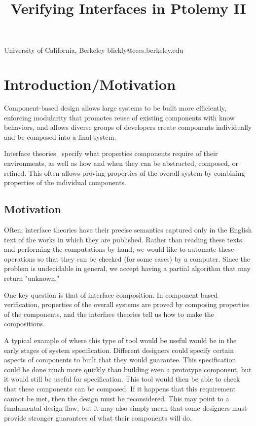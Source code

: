 \documentclass[preprint,11pt]{sigplanconf}
\begin{document}
\title{Verifying Interfaces in Ptolemy II}

           {University of California, Berkeley} {blickly@eecs.berkeley.edu}

\maketitle

\begin{abstract}
\end{abstract}

\section{Introduction/Motivation}
Component-based design allows large systems to be built more efficiently,
enforcing modularity that promotes reuse of existing components with
know behaviors, and allows diverse groups of developers create components
individually and be composed into a final system. 

Interface theories~\cite{interfaceTheories} specify what properties components
require of their environments, as well as how and when they can be abstracted,
composed, or refined.
This often allows proving
properties of the overall system by combining properties of the individual
components.

\subsection{Motivation}
Often, interface theories have their precise semantics captured only in the
English text of the works in which they are published. Rather than reading these
texts and performing the computations by hand, we would like to automate these
operations so that they can be checked (for some cases) by a computer. Since the
problem is undecidable in general, we accept having a partial algorithm that may
return "unknown."

One key question is that of interface composition.  In component based
verification, properties of the overall systems are proved by composing
properties of the components, and the interface theories tell us how to make
the compositions.

A typical example of where this type of tool would be useful would be in the
early stages of system specification. Different designers could specify certain
aspects of components to built that they would guarantee. This specification
could be done much more quickly than building even a prototype component, but
it would still be useful for specification. This tool would then be able to
check that these components can be composed. If it happens that this
requirement cannot be met, then the design must be reconsidered. This may point
to a fundamental design flaw, but it may also simply mean that some designers
must provide stronger guarantees of what their components will do.
\end{document}
